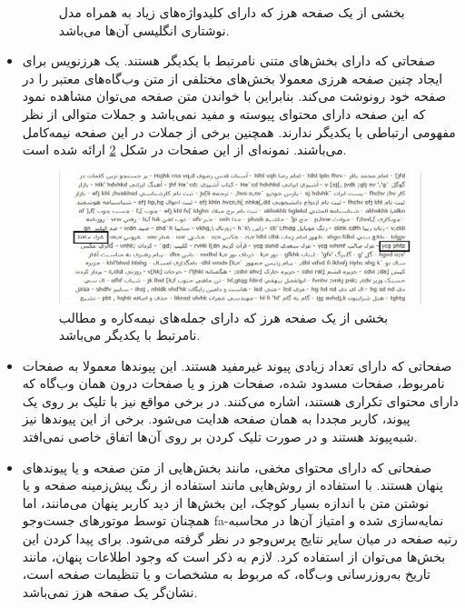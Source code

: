 \documentclass[twoside, a4paper,11pt]{book}
\numberwithin{equation}{chapter}
\numberwithin{table}{chapter}
\numberwithin{figure}{chapter}
\numberwithin{equation}{chapter}
\newcommand{\mls}[1]{\gls{fa-#1}\glsuseri{la-#1}}
\begin{document}
\begin{itemize}
\begin{figure}
\caption{\label{fig:s2}
بخشی از یک صفحه هرز که دارای کلیدواژه‌های زیاد به همراه مدل نوشتاری انگلیسی آن‌ها می‌باشد.
}
\end{figure}
\item
صفحاتی که دارای بخش‌های متنی نامرتبط با یکدیگر هستند. یک هرزنویس برای ایجاد چنین صفحه‌ هرزی معمولا بخش‌های مختلفی از متن وب‌گاه‌های معتبر را در صفحه خود رونوشت می‌کند. بنابراین با خواندن متن صفحه می‌توان مشاهده نمود که این صفحه دارای محتوای پیوسته و مفید نمی‌باشد و جملات متوالی از نظر مفهومی ارتباطی با یکدیگر ندارند. همچنین برخی از جملات در این صفحه نیمه‌کامل می‌باشند. نمونه‌ای از این صفحات در شکل \ref{fig:s3} ارائه شده است. 
\begin{figure}
\centering
\includegraphics[scale=0.6]{Figures/spam3.png}
\caption{\label{fig:s3}
بخشی از یک صفحه هرز که دارای جمله‌های نیمه‌کاره و مطالب نامرتبط با یکدیگر می‌باشد.
}
\end{figure}

\item
صفحاتی که دارای تعداد زیادی پیوند غیرمفید هستند. این پیوندها معمولا به صفحات نامربوط، صفحات مسدود شده، صفحات هرز و یا صفحات درون همان وب‌گاه که دارای محتوای تکراری هستند، اشاره می‌کنند. در برخی مواقع نیز با تلیک بر روی یک پیوند، کاربر مجددا به همان صفحه هدایت می‌شود. برخی از این پیوندها نیز شبه‌پیوند هستند و در صورت تلیک کردن بر روی آن‌ها اتفاق خاصی نمی‌افتد.
\item
صفحاتی که دارای محتوای مخفی، مانند بخش‌هایی از متن صفحه و یا پیوندهای پنهان هستند. با استفاده از روش‌هایی مانند استفاده از رنگ پیش‌زمینه صفحه و یا نوشتن متن با اندازه بسیار کوچک، این بخش‌ها از دید کاربر پنهان می‌­مانند، اما همچنان توسط موتورهای جست‌و‌جو \mls{نمایه‌سازی} شده و امتیاز آن‌ها در محاسبه رتبه صفحه در میان سایر نتایج پرس‌وجو در نظر گرفته می‌شود. برای پیدا کردن این بخش‌ها می‌توان از  استفاده کرد. 
لازم به ذکر است که وجود اطلاعات پنهان، مانند تاریخ به‌روزرسانی وب‌گاه، که مربوط به مشخصات و یا تنظیمات صفحه است، نشان‌گر یک صفحه هرز نمی‌باشد.


\end{itemize}
\end{document}
